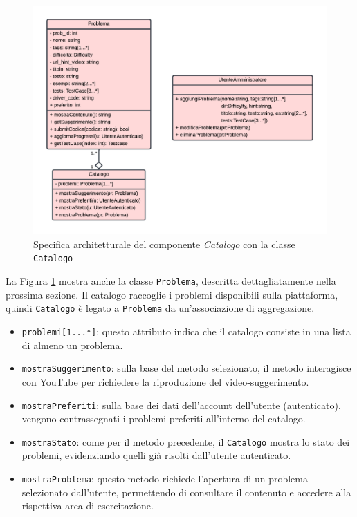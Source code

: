 \documentclass[11pt, a4paper]{article}
\theoremstyle{definition} %
\begin{document}
\begin{figure}[H]
\centering
\hspace*{-3cm}
\includegraphics[scale = 0.9]{materiale/class-catalogo.pdf}
\caption{Specifica architetturale del componente \textit{Catalogo} con la classe \texttt{Catalogo}}
\label{catalog}
\end{figure}
\noindent La Figura \ref{catalog} mostra anche la classe \texttt{Problema},
descritta dettagliatamente nella prossima sezione. Il catalogo
raccoglie i problemi disponibili sulla piattaforma, quindi \texttt{Catalogo}
è legato a \texttt{Problema} da un'associazione di aggregazione.


\begin{itemize}
    \item \texttt{problemi[1...*]}: questo attributo indica che il catalogo
    consiste in una lista di almeno un problema.

    \item \texttt{mostraSuggerimento}: sulla base del metodo selezionato, il metodo
    interagisce con YouTube per richiedere la riproduzione del video-suggerimento.

    \item \texttt{mostraPreferiti}: sulla base dei dati dell'account
    dell'utente (autenticato), vengono contrassegnati i problemi preferiti
    all'interno del catalogo.

    \item \texttt{mostraStato}: come per il metodo precedente, il
    \texttt{Catalogo} mostra lo stato dei problemi, evidenziando quelli
    già risolti dall'utente autenticato.

    \item \texttt{mostraProblema}: questo metodo richiede l'apertura
    di un problema selezionato dall'utente, permettendo di consultare il
    contenuto e accedere alla rispettiva area di esercitazione.
\end{itemize}
\end{document}
